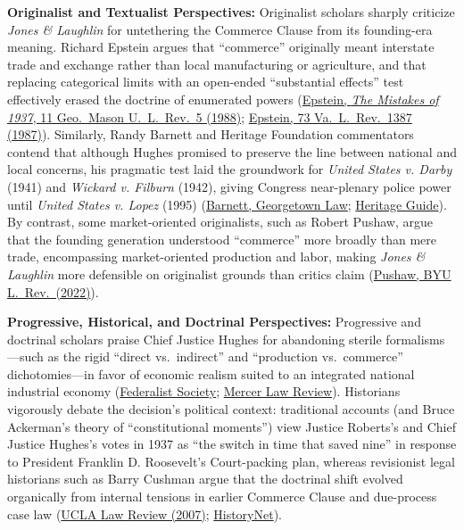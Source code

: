 \documentclass[12pt]{article}
\begin{document}
\textbf{Originalist and Textualist Perspectives:} Originalist scholars sharply criticize \textit{Jones \& Laughlin} for untethering the Commerce Clause from its founding-era meaning. Richard Epstein argues that ``commerce'' originally meant interstate trade and exchange rather than local manufacturing or agriculture, and that replacing categorical limits with an open-ended ``substantial effects'' test effectively erased the doctrine of enumerated powers (\href{https://chicagounbound.uchicago.edu/cgi/viewcontent.cgi?referer=&httpsredir=1&article=2284&context=journal_articles}{Epstein, \textit{The Mistakes of 1937}, 11 Geo.\ Mason U.\ L.\ Rev.\ 5 (1988)}; \href{https://chicagounbound.uchicago.edu/cgi/viewcontent.cgi?article=2315&context=journal_articles}{Epstein, 73 Va.\ L.\ Rev.\ 1387 (1987)}). Similarly, Randy Barnett and Heritage Foundation commentators contend that although Hughes promised to preserve the line between national and local concerns, his pragmatic test laid the groundwork for \textit{United States v. Darby} (1941) and \textit{Wickard v. Filburn} (1942), giving Congress near-plenary police power until \textit{United States v. Lopez} (1995) (\href{https://scholarship.law.georgetown.edu/cgi/viewcontent.cgi?article=1433&context=facpub&sei-redir=1}{Barnett, Georgetown Law}; \href{https://constitution.heritage.org/essays/a1-s8-c3-b/}{Heritage Guide}). By contrast, some market-oriented originalists, such as Robert Pushaw, argue that the founding generation understood ``commerce'' more broadly than mere trade, encompassing market-oriented production and labor, making \textit{Jones \& Laughlin} more defensible on originalist grounds than critics claim (\href{https://digitalcommons.law.byu.edu/cgi/viewcontent.cgi?article=3408&context=lawreview}{Pushaw, BYU L.\ Rev.\ (2022)}).

\textbf{Progressive, Historical, and Doctrinal Perspectives:} Progressive and doctrinal scholars praise Chief Justice Hughes for abandoning sterile formalisms---such as the rigid ``direct vs.\ indirect'' and ``production vs.\ commerce'' dichotomies---in favor of economic realism suited to an integrated national industrial economy (\href{https://fedsoc.org/case/nlrb-v-jones-laughlin-steel-corp}{Federalist Society}; \href{https://digitalcommons.law.mercer.edu/cgi/viewcontent.cgi?article=2003&context=jour_mlr}{Mercer Law Review}). Historians vigorously debate the decision's political context: traditional accounts (and Bruce Ackerman's theory of ``constitutional moments'') view Justice Roberts's and Chief Justice Hughes's votes in 1937 as ``the switch in time that saved nine'' in response to President Franklin D. Roosevelt's Court-packing plan, whereas revisionist legal historians such as Barry Cushman argue that the doctrinal shift evolved organically from internal tensions in earlier Commerce Clause and due-process case law (\href{https://www.uclalawreview.org/wp-content/uploads/2019/09/48_54UCLALRev1847August2007.pdf}{UCLA Law Review (2007)}; \href{https://historynet.com/1937-labor-board-case-upheld-workers-right-to-organize/}{HistoryNet}).
\end{document}
